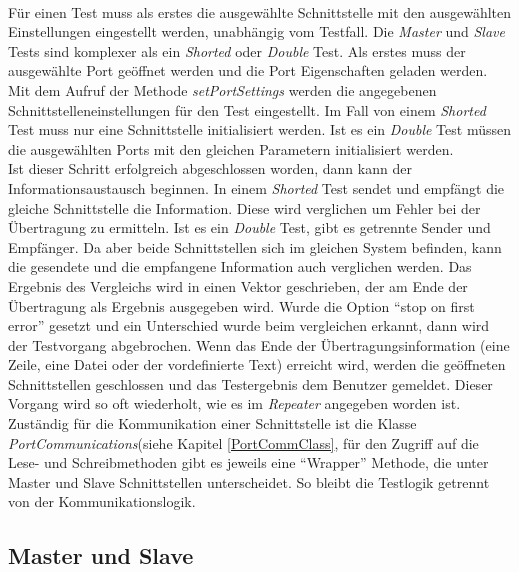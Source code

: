 \paragraph{}
Für einen Test muss als erstes die ausgewählte Schnittstelle mit den ausgewählten Einstellungen eingestellt werden, unabhängig vom Testfall. Die \textit{Master} und \textit{Slave} Tests sind komplexer als ein \textit{Shorted} oder \textit{Double} Test. Als erstes muss der ausgewählte Port geöffnet werden und die Port Eigenschaften geladen werden. Mit dem Aufruf der Methode \textit{setPortSettings} werden die angegebenen Schnittstelleneinstellungen für den Test eingestellt. Im Fall von einem \textit{Shorted} Test muss nur eine Schnittstelle initialisiert werden. Ist es ein \textit{Double} Test müssen die ausgewählten Ports mit den gleichen Parametern initialisiert werden.\\

Ist dieser Schritt erfolgreich abgeschlossen worden, dann kann der Informationsaustausch beginnen. In einem \textit{Shorted} Test sendet und empfängt die gleiche Schnittstelle die Information. Diese wird verglichen um Fehler bei der Übertragung zu ermitteln. Ist es ein \textit{Double} Test, gibt es getrennte Sender und Empfänger. Da aber beide Schnittstellen sich im gleichen System befinden, kann die gesendete und die empfangene Information auch verglichen werden. Das Ergebnis des Vergleichs wird in einen Vektor geschrieben, der am Ende der Übertragung als Ergebnis ausgegeben wird. Wurde die Option "`stop on first error"' gesetzt und ein Unterschied wurde beim vergleichen erkannt, dann wird der Testvorgang abgebrochen. Wenn das Ende der Übertragungsinformation (eine Zeile, eine Datei oder der vordefinierte Text) erreicht wird, werden die geöffneten Schnittstellen geschlossen und das Testergebnis dem Benutzer gemeldet. Dieser Vorgang wird so oft wiederholt, wie es im \textit{Repeater} angegeben worden ist.\\

Zuständig für die Kommunikation einer Schnittstelle ist die Klasse \textit{PortCommunications}(siehe Kapitel \ref{PortCommClass}, für den Zugriff auf die Lese- und Schreibmethoden gibt es jeweils eine "`Wrapper"' Methode, die unter Master und Slave Schnittstellen unterscheidet. So bleibt die Testlogik getrennt von der Kommunikationslogik.

\subsection{Master und Slave}
